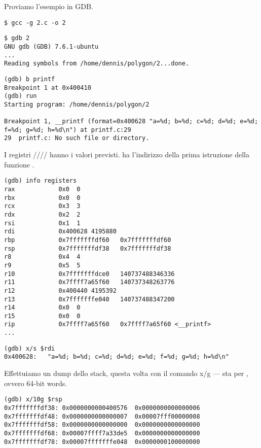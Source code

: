 
Proviamo l'esempio in \ac{GDB}.

\begin{lstlisting}
$ gcc -g 2.c -o 2
\end{lstlisting}

\begin{lstlisting}
$ gdb 2
GNU gdb (GDB) 7.6.1-ubuntu
...
Reading symbols from /home/dennis/polygon/2...done.
\end{lstlisting}

\begin{lstlisting}[caption=impostiamo il breakpoint su \printf{,} e avviamo]
(gdb) b printf
Breakpoint 1 at 0x400410
(gdb) run
Starting program: /home/dennis/polygon/2 

Breakpoint 1, __printf (format=0x400628 "a=%d; b=%d; c=%d; d=%d; e=%d; f=%d; g=%d; h=%d\n") at printf.c:29
29	printf.c: No such file or directory.
\end{lstlisting}

I registri \RSI/\RDX/\RCX// hanno i valori previsti.
\RIP ha l'indirizzo della prima istruzione della funzione \printf.

\begin{lstlisting}
(gdb) info registers
rax            0x0	0
rbx            0x0	0
rcx            0x3	3
rdx            0x2	2
rsi            0x1	1
rdi            0x400628	4195880
rbp            0x7fffffffdf60	0x7fffffffdf60
rsp            0x7fffffffdf38	0x7fffffffdf38
r8             0x4	4
r9             0x5	5
r10            0x7fffffffdce0	140737488346336
r11            0x7ffff7a65f60	140737348263776
r12            0x400440	4195392
r13            0x7fffffffe040	140737488347200
r14            0x0	0
r15            0x0	0
rip            0x7ffff7a65f60	0x7ffff7a65f60 <__printf>
...
\end{lstlisting}

\begin{lstlisting}[caption=ispezioniamo la format string]
(gdb) x/s $rdi
0x400628:	"a=%d; b=%d; c=%d; d=%d; e=%d; f=%d; g=%d; h=%d\n"
\end{lstlisting}

Effettuiamo un dump dello stack, questa volta con il comando x/g --- sta per , ovvero 64-bit words.

\begin{lstlisting}
(gdb) x/10g $rsp
0x7fffffffdf38:	0x0000000000400576	0x0000000000000006
0x7fffffffdf48:	0x0000000000000007	0x00007fff00000008
0x7fffffffdf58:	0x0000000000000000	0x0000000000000000
0x7fffffffdf68:	0x00007ffff7a33de5	0x0000000000000000
0x7fffffffdf78:	0x00007fffffffe048	0x0000000100000000
\end{lstlisting}

